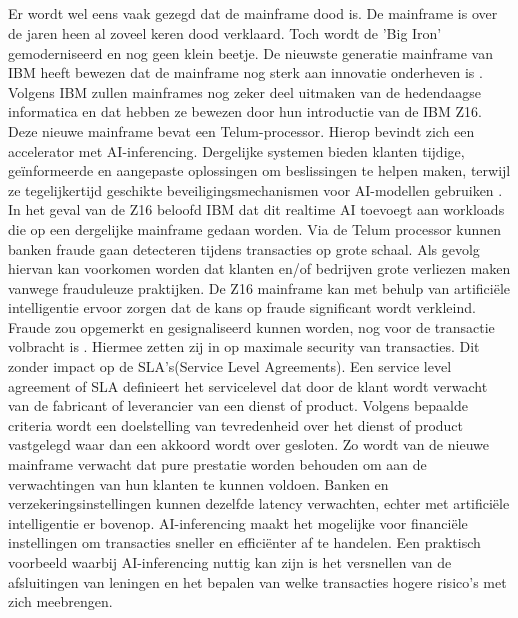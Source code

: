 \subsection{}
\label{sec:De laatste nieuwe mainframe technologie}

Er wordt wel eens vaak gezegd dat de mainframe dood is. De mainframe is over de jaren heen al zoveel keren dood verklaard. Toch wordt de 'Big Iron' gemoderniseerd en nog geen klein beetje. De nieuwste generatie mainframe van IBM heeft bewezen dat de mainframe nog sterk aan innovatie onderheven is \autocite{Almekinders2022}. Volgens IBM zullen mainframes nog zeker deel uitmaken van de hedendaagse informatica en dat hebben ze bewezen door hun introductie van de IBM Z16. Deze nieuwe mainframe bevat een Telum-processor. Hierop bevindt zich een accelerator met AI-inferencing. Dergelijke systemen bieden klanten tijdige, geïnformeerde en aangepaste oplossingen om beslissingen te helpen maken, terwijl ze tegelijkertijd geschikte beveiligingsmechanismen voor AI-modellen gebruiken \autocite{Cammarota2020}. In het geval van de Z16 beloofd IBM dat dit realtime AI toevoegt aan workloads die op een dergelijke mainframe gedaan worden. Via de Telum processor kunnen banken fraude gaan detecteren tijdens transacties op grote schaal. Als gevolg hiervan kan voorkomen worden dat klanten en/of bedrijven grote verliezen maken vanwege frauduleuze praktijken. De Z16 mainframe kan met behulp van artificiële intelligentie ervoor zorgen dat de kans op fraude significant wordt verkleind. Fraude zou opgemerkt en gesignaliseerd kunnen worden, nog voor de transactie volbracht is \autocite{Saran2022}. Hiermee zetten zij in op maximale security van transacties. Dit zonder impact op de SLA's(Service Level Agreements). Een service level agreement of SLA definieert het servicelevel dat door de klant wordt verwacht van de fabricant of leverancier van een dienst of product. Volgens bepaalde criteria wordt een doelstelling van tevredenheid over het dienst of product vastgelegd waar dan een akkoord wordt over gesloten. Zo wordt van de nieuwe mainframe verwacht dat pure prestatie worden behouden om aan de verwachtingen van hun klanten te kunnen voldoen. Banken en verzekeringsinstellingen kunnen dezelfde latency verwachten, echter met artificiële intelligentie er bovenop. 
AI-inferencing maakt het mogelijke voor financiële instellingen om transacties sneller en efficiënter af te handelen. Een praktisch voorbeeld waarbij AI-inferencing nuttig kan zijn is het versnellen van de afsluitingen van leningen en het bepalen van welke transacties hogere risico's met zich meebrengen. 

